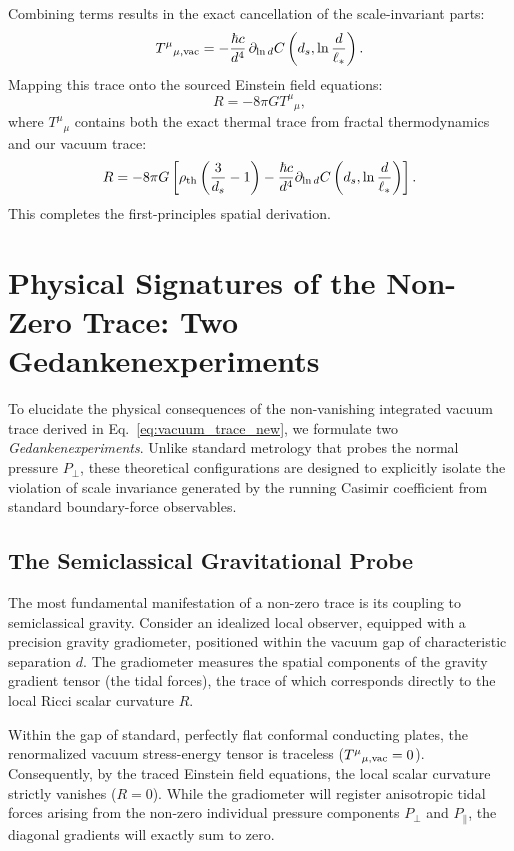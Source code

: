 \documentclass[12pt,letterpaper]{article}
\begin{document}
Combining terms results in the exact cancellation of the scale-invariant parts:
\begin{equation}
T^\mu{}_{\mu,\rm vac} = -\frac{\hbar c}{d^4} \,\partial_{\ln d}C\left(d_s, \ln\frac{d}{\ell_*}\right).
\label{eq:SI_trace_final}
\end{equation}
Mapping this trace onto the sourced Einstein field equations:
\begin{equation}
R = -8\pi G T^\mu{}_\mu,
\label{eq:SI_einstein}
\end{equation}
where $T^\mu{}_\mu$ contains both the exact thermal trace from fractal thermodynamics and our vacuum trace:
\begin{equation}
R = -8\pi G \left[ \rho_{\rm th}\left(\frac{3}{d_s} - 1\right) - \frac{\hbar c}{d^4} \partial_{\ln d} C\left(d_s, \ln\frac{d}{\ell_*}\right) \right].
\label{eq:SI_curvature_final}
\end{equation}
This completes the first-principles spatial derivation.

\section{Physical Signatures of the Non-Zero Trace: Two Gedankenexperiments}
\label{sec:gedanken}

To elucidate the physical consequences of the non-vanishing integrated vacuum trace derived in Eq.~\eqref{eq:vacuum_trace_new}, we formulate two \emph{Gedankenexperiments}. Unlike standard metrology that probes the normal pressure $P_\perp$, these theoretical configurations are designed to explicitly isolate the violation of scale invariance generated by the running Casimir coefficient from standard boundary-force observables.

\subsection{The Semiclassical Gravitational Probe}

The most fundamental manifestation of a non-zero trace is its coupling to semiclassical gravity. Consider an idealized local observer, equipped with a precision gravity gradiometer, positioned within the vacuum gap of characteristic separation $d$. The gradiometer measures the spatial components of the gravity gradient tensor (the tidal forces), the trace of which corresponds directly to the local Ricci scalar curvature $R$.

Within the gap of standard, perfectly flat conformal conducting plates, the renormalized vacuum stress-energy tensor is traceless ($T^\mu{}_{\mu,\rm vac} = 0$). Consequently, by the traced Einstein field equations, the local scalar curvature strictly vanishes ($R = 0$). While the gradiometer will register anisotropic tidal forces arising from the non-zero individual pressure components $P_\perp$ and $P_\parallel$, the diagonal gradients will exactly sum to zero.
\end{document}
